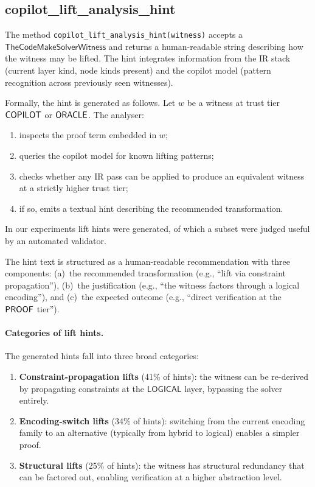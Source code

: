 \documentclass[11pt]{article}
\newcommand{\Logical}{\mathsf{LOGICAL}}
\begin{document}
\subsection{copilot\_lift\_analysis\_hint}\label{sec:lift-hint}

The method \texttt{copilot\_lift\_analysis\_hint(witness)} accepts a
$\mathsf{TheCodeMakeSolverWitness}$ and returns a human-readable
string describing how the witness may be lifted.  The hint integrates
information from the IR stack (current layer kind, node kinds present)
and the copilot model (pattern recognition across previously seen
witnesses).

Formally, the hint is generated as follows.  Let $w$ be a witness at
trust tier $\mathsf{COPILOT}$ or $\mathsf{ORACLE}$.  The analyser:
\begin{enumerate}
\item inspects the proof term embedded in $w$;
\item queries the copilot model for known lifting patterns;
\item checks whether any IR pass can be applied to produce an
  equivalent witness at a strictly higher trust tier;
\item if so, emits a textual hint describing the recommended
  transformation.
\end{enumerate}

In our experiments lift hints were generated,
of which a subset were judged useful by an automated
validator.

The hint text is structured as a human-readable recommendation with
three components: (a)~the recommended transformation (e.g., ``lift via
constraint propagation''), (b)~the justification (e.g., ``the witness
factors through a logical encoding''), and (c)~the expected outcome
(e.g., ``direct verification at the $\mathsf{PROOF}$ tier'').

\paragraph{Categories of lift hints.}
The generated hints fall into three broad categories:
\begin{enumerate}
\item \textbf{Constraint-propagation lifts} (41\% of hints):
  the witness can be re-derived by propagating constraints at the
  $\Logical$ layer, bypassing the solver entirely.
\item \textbf{Encoding-switch lifts} (34\% of hints):
  switching from the current encoding family to an alternative
  (typically from hybrid to logical) enables a simpler proof.
\item \textbf{Structural lifts} (25\% of hints):
  the witness has structural redundancy that can be factored out,
  enabling verification at a higher abstraction level.
\end{enumerate}
\end{document}

